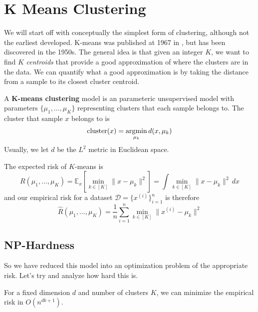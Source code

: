 \section{K Means Clustering} 

  We will start off with conceptually the simplest form of clustering, although not the earliest developed. K-means was published at 1967 in \cite{1967macqueen}, but has been discovered in the 1950s. The general idea is that given an integer $K$, we want to find $K$ \textit{centroids} that provide a good approximation of where the clusters are in the data. We can quantify what a good approximation is by taking the distance from a sample to its closest cluster centroid.

  \begin{definition}
    A \textbf{K-means clustering} model is an parameteric unsupervised model with parameters $\{\mu_1, \ldots, \mu_K\}$ representing clusters that each sample belongs to. The cluster that sample $x$ belongs to is 
    \begin{equation}
      \mathrm{cluster}(x) = \argmin_{\mu_k} d(x, \mu_k)
    \end{equation}
    Usually, we let $d$ be the $L^2$ metric in Euclidean space. 
  \end{definition}

  \begin{theorem}[Risk]
    The expected risk of $K$-means is 
    \begin{equation}
      R(\mu_1, \ldots, \mu_K) = \mathbb{E}_x \left[ \min_{k \in [K]} \| x - \mu_k \|^2 \right] = \int \min_{k \in [K]} \| x - \mu_k \|^2 \,dx
    \end{equation} 
    and our empirical risk for a dataset $\mathcal{D} = \{x^{(i)}\}_{i=1}^n$ is therefore 
    \begin{equation}
      \hat{R}(\mu_1, \ldots, \mu_K) = \frac{1}{n} \sum_{i=1}^n \min_{k \in [K]} \| x^{(i)} - \mu_k \|^2
    \end{equation} 
  \end{theorem} 

\subsection{NP-Hardness}

  So we have reduced this model into an optimization problem of the appropriate risk. Let's try and analyze how hard this is. 

  \begin{theorem}
    For a fixed dimension $d$ and number of clusters $K$, we can minimize the empirical risk in $O(n^{dk + 1})$. 
  \end{theorem} 

